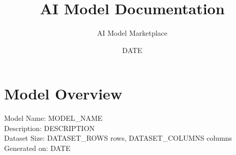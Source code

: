 \documentclass{article}
\begin{document}
\title{AI Model Documentation}
\author{AI Model Marketplace}
\date{{DATE}}
\maketitle
\section{Model Overview}
Model Name: {{MODEL_NAME}} \\
Description: {{DESCRIPTION}} \\
Dataset Size: {{DATASET_ROWS}} rows, {{DATASET_COLUMNS}} columns \\
Generated on: {{DATE}}
\end{document}
